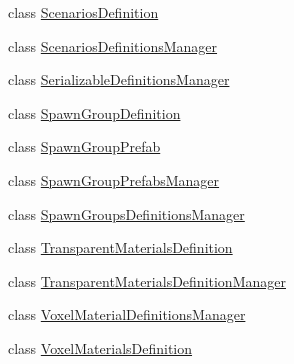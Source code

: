 \begin{DoxyCompactItemize}
class \hyperlink{class_s_e_mod_a_p_i_1_1_a_p_i_1_1_definitions_1_1_scenarios_definition}{Scenarios\+Definition}
\item 
class \hyperlink{class_s_e_mod_a_p_i_1_1_a_p_i_1_1_definitions_1_1_scenarios_definitions_manager}{Scenarios\+Definitions\+Manager}
\item 
class \hyperlink{class_s_e_mod_a_p_i_1_1_a_p_i_1_1_definitions_1_1_serializable_definitions_manager}{Serializable\+Definitions\+Manager}
\item 
class \hyperlink{class_s_e_mod_a_p_i_1_1_a_p_i_1_1_definitions_1_1_spawn_group_definition}{Spawn\+Group\+Definition}
\item 
class \hyperlink{class_s_e_mod_a_p_i_1_1_a_p_i_1_1_definitions_1_1_spawn_group_prefab}{Spawn\+Group\+Prefab}
\item 
class \hyperlink{class_s_e_mod_a_p_i_1_1_a_p_i_1_1_definitions_1_1_spawn_group_prefabs_manager}{Spawn\+Group\+Prefabs\+Manager}
\item 
class \hyperlink{class_s_e_mod_a_p_i_1_1_a_p_i_1_1_definitions_1_1_spawn_groups_definitions_manager}{Spawn\+Groups\+Definitions\+Manager}
\item 
class \hyperlink{class_s_e_mod_a_p_i_1_1_a_p_i_1_1_definitions_1_1_transparent_materials_definition}{Transparent\+Materials\+Definition}
\item 
class \hyperlink{class_s_e_mod_a_p_i_1_1_a_p_i_1_1_definitions_1_1_transparent_materials_definition_manager}{Transparent\+Materials\+Definition\+Manager}
\item 
class \hyperlink{class_s_e_mod_a_p_i_1_1_a_p_i_1_1_definitions_1_1_voxel_material_definitions_manager}{Voxel\+Material\+Definitions\+Manager}
\item 
class \hyperlink{class_s_e_mod_a_p_i_1_1_a_p_i_1_1_definitions_1_1_voxel_materials_definition}{Voxel\+Materials\+Definition}
\end{DoxyCompactItemize}
